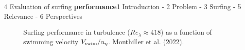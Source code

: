 \begin{frame}{4 Evaluation of surfing \textbf{performance}}{1 Introduction - 2 Problem - 3 Surfing - 5 Relevance - 6 Perspectives}
	\centering
	\vspace{-10pt}
	\begin{figure}
		
		\caption{
			Surfing performance in turbulence ($\mathit{Re}_{\lambda} \approx 418$) as a function of swimming velocity $V_{\mathrm{swim}} / u_{\eta}$. Monthiller et al. (2022).
		}
	\end{figure}

	\vspace{-10pt}
\end{frame}


